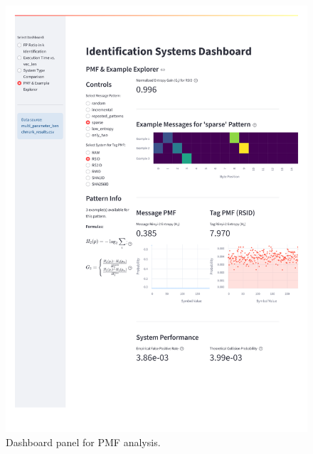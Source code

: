 \documentclass[english,BCOR=4mm,cdfont=false]{tudscrreprt} %
\begin{document}
\begin{figure}[hp]
  \centering
  \includegraphics[width=\textwidth]{images/pmf_dash.pdf}
  \caption{Dashboard panel for PMF analysis.}
  \label{fig:dashPMF}
\end{figure}
\end{document}
